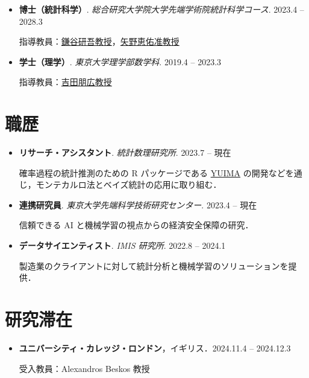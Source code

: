 \documentclass[
  11pt,
]{article}
\renewcommand{\labelitemi}{\textcolor{minty}{\faCheckCircle}} %
\begin{document}
\renewcommand{\labelitemi}{\textcolor{minty}{\faGraduationCap}}

\begin{itemize}
\item
  \textbf{博士（統計科学）}.
  \emph{総合研究大学院大学先端学術院統計科学コース}. \hfill {2023.4 --
  2028.3}

  指導教員：\href{https://sites.google.com/view/kengokamatani/home}{鎌谷研吾教授}，\href{https://sites.google.com/site/kyanostat/}{矢野恵佑准教授}
\item
  \textbf{学士（理学）}. \emph{東京大学理学部数学科}. \hfill {2019.4 --
  2023.3}

  指導教員：\href{https://www.ms.u-tokyo.ac.jp/~nakahiro/hp-naka-e}{吉田朋広教授}
\end{itemize}

\section{職歴}\label{ux8077ux6b74}

\renewcommand{\labelitemi}{\textcolor{minty}{\faUniversity}}

\begin{itemize}
\item
  \textbf{リサーチ・アシスタント}. \emph{統計数理研究所}. \hfill {2023.7
  -- 現在}

  確率過程の統計推測のための R パッケージである
  \href{https://r-forge.r-project.org/projects/yuima/}{YUIMA}
  の開発などを通じ，モンテカルロ法とベイズ統計の応用に取り組む．
\item
  \textbf{連携研究員}. \emph{東京大学先端科学技術研究センター}.
  \hfill {2023.4 -- 現在}

  信頼できる AI と機械学習の視点からの経済安全保障の研究．
\item
  \textbf{データサイエンティスト}. \emph{IMIS 研究所}. \hfill {2022.8 --
  2024.1}

  製造業のクライアントに対して統計分析と機械学習のソリューションを提供．
\end{itemize}

\section{研究滞在}\label{ux7814ux7a76ux6edeux5728}

\begin{itemize}
\item
  \textbf{ユニバーシティ・カレッジ・ロンドン}，イギリス．\hfill {2024.11.4
  -- 2024.12.3}

  受入教員：Alexandros Beskos 教授
\end{itemize}

\renewcommand{\labelitemi}{\textcolor{minty}{\faBookmark}}
\end{document}

